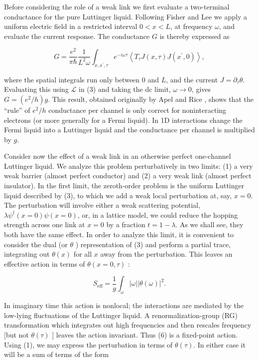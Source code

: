 \documentclass[11pt]{article}
\begin{document}
Before considering the role of a weak link we first evaluate a two-terminal conductance for the pure Luttinger liquid. Following Fisher and Lee \cite{ref12} we apply a uniform electric field in a restricted interval $0<x<L$, at frequency $\omega$, and evaluate the current response. The conductance $G$ is thereby expressed as

\begin{equation}
G=\frac{e^{2}}{\pi \hbar} \frac{1}{L^{2} \omega} \int_{x, x^{\prime}, \tau} e^{-i \omega \tau}\left\langle T_{\tau} J(x, \tau) J\left(x^{\prime}, 0\right)\right\rangle, 
\end{equation}

where the spatial integrals run only between 0 and $L$, and the current $J=\partial_{\tau} \theta$. Evaluating this using $\mathcal{L}$ in (3) and taking the dc limit, $\omega \rightarrow 0$, gives $G=\left(e^{2} / h\right) g$. This result, obtained originally by Apel and Rice \cite{ref13}, shows that the ``rule'' of $e^{2} / h$ conductance per channel \cite{ref6} is only correct for noninteracting electrons (or more generally for a Fermi liquid). In 1D interactions change the Fermi liquid into a Luttinger liquid and the conductance per channel is multiplied by $g$.

Consider now the effect of a weak link in an otherwise perfect one-channel Luttinger liquid. We analyze this problem perturbatively in two limits: (1) a very weak barrier (almost perfect conductor) and (2) a very weak link (almost perfect insulator). In the first limit, the zeroth-order problem is the uniform Luttinger liquid described by (3), to which we add a weak local perturbation at, say, $x=0$. The perturbation will involve either a weak scattering potential, $\lambda \psi^{\dagger}(x=0) \psi(x=0)$, or, in a lattice model, we could reduce the hopping strength across one link at $x=0$ by a fraction $t=1-\lambda$. As we shall see, they both have the same effect. In order to analyze this limit, it is convenient to consider the dual (or $\theta$ ) representation of (3) and perform a partial trace, integrating out $\theta(x)$ for all $x$ away from the perturbation. This leaves an effective action in terms of $\theta(x=0, \tau)$ :

\begin{equation}
S_{\mathrm{eff}}=\frac{1}{g} \int_{\omega}|\omega||\theta(\omega)|^{2} . 
\end{equation}

In imaginary time this action is nonlocal; the interactions are mediated by the low-lying fluctuations of the Luttinger liquid. A renormalization-group (RG) transformation which integrates out high frequencies and then rescales frequency [but not $\theta(\tau)$ ] leaves the action invariant. Thus (6) is a fixed-point action. Using (1), we may express the perturbation in terms of $\theta(\tau)$. In either case it will be a sum of terms of the form
\end{document}
